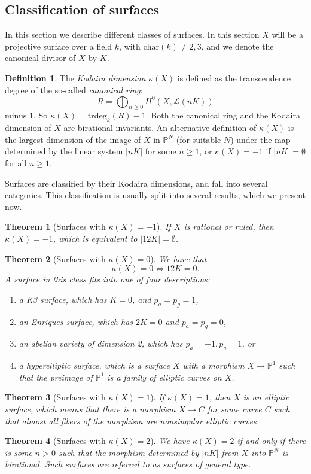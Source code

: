 \documentclass[12pt,twoside]{reedthesis}
\theoremstyle{plain}
\newtheorem{theorem}{Theorem}[chapter]
\theoremstyle{definition}
\newtheorem{definition}{Definition}[section]
\theoremstyle{remark}
\newcommand{\Proj}{\mathbb{P}}
\begin{document}
\subsection{Classification of surfaces}
In this section we describe different classes of surfaces. In this section $X$ will be a projective surface over a field $k$, with $\text{char}(k)\neq2,3$, and we denote the canonical divisor of $X$ by $K$.
\begin{definition}
The \emph{Kodaira dimension} $\kappa(X)$ is defined as the transcendence degree of the so-called \emph{canonical ring}:
\[R=\bigoplus_{n\geq0}H^0(X,\mathcal{L}(nK))\]
minus 1. So $\kappa(X)=\text{trdeg}_k(R)-1$. Both the canonical ring and the Kodaira dimension of $X$ are birational invariants. An alternative definition of $\kappa(X)$ is the largest dimension of the image of $X$ in $\Proj^N$ (for suitable $N$) under the map determined by the linear system $|nK|$ for some $n\geq1$, or $\kappa(X)=-1$ if $|nK|=\emptyset$ for all $n\geq1$.
\end{definition}
Surfaces are classified by their Kodaira dimensions, and fall into several categories. This classification is usually split into several results, which we present now.
\begin{theorem}[Surfaces with $\kappa(X)=-1$]
If $X$ is \emph{rational} or \emph{ruled}, then $\kappa(X)=-1$, which is equivalent to $|12K|=\emptyset$.
\end{theorem}
\begin{theorem}[Surfaces with $\kappa(X)=0$]
We have that \[\kappa(X)=0\iff 12K=0.\] A surface in this class fits into one of four descriptions:
\begin{enumerate}
\item a \emph{K3 surface}, which has $K=0$, and $p_a=p_g=1$,
\item an \emph{Enriques surface}, which has $2K=0$ and $p_a=p_g=0$,
\item an \emph{abelian variety of dimension 2}, which has $p_a=-1,p_g=1$, or
\item a \emph{hyperelliptic surface}, which is a surface $X$ with a morphism $X\to\Proj^1$ such that the preimage of $\Proj^1$ is a family of elliptic curves on $X$.
\end{enumerate}
\end{theorem}
\begin{theorem}[Surfaces with $\kappa(X)=1$]
If $\kappa(X)=1$, then $X$ is an \emph{elliptic surface}, which means that there is a morphism $X\to C$ for some curve $C$ such that almost all fibers of the morphism are nonsingular elliptic curves.
\end{theorem}
\begin{theorem}[Surfaces with $\kappa(X)=2$]
We have $\kappa(X)=2$ if and only if there is some $n>0$ such that the morphism determined by $|nK|$ from $X$ into $\Proj^N$ is birational. Such surfaces are referred to as \emph{surfaces of general type}. 
\end{theorem}
\end{document}
